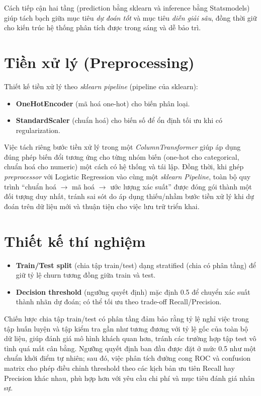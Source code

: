 Cách tiếp cận hai tầng (prediction bằng sklearn và inference bằng Statsmodels) giúp tách bạch giữa mục tiêu \textit{dự đoán tốt} và mục tiêu \textit{diễn giải sâu}, đồng thời giữ cho kiến trúc hệ thống phân tích được trong sáng và dễ bảo trì.

\section{Tiền xử lý (Preprocessing)}
Thiết kế tiền xử lý theo \textit{sklearn pipeline} (pipeline của sklearn):
\begin{itemize}
  \item \textbf{OneHotEncoder} (mã hoá one-hot) cho biến phân loại.
  \item \textbf{StandardScaler} (chuẩn hoá) cho biến số để ổn định tối ưu khi có regularization.
\end{itemize}
\noindent
Việc tách riêng bước tiền xử lý trong một \textit{ColumnTransformer} giúp áp dụng đúng phép biến đổi tương ứng cho từng nhóm biến (one-hot cho categorical, chuẩn hoá cho numeric) một cách có hệ thống và tái lập. Đồng thời, khi ghép \textit{preprocessor} với Logistic Regression vào cùng một \textit{sklearn Pipeline}, toàn bộ quy trình ``chuẩn hoá $\rightarrow$ mã hoá $\rightarrow$ ước lượng xác suất'' được đóng gói thành một đối tượng duy nhất, tránh sai sót do áp dụng thiếu/nhầm bước tiền xử lý khi dự đoán trên dữ liệu mới và thuận tiện cho việc lưu trữ triển khai.

\section{Thiết kế thí nghiệm}
\begin{itemize}
  \item \textbf{Train/Test split} (chia tập train/test) dạng stratified (chia có phân tầng) để giữ tỷ lệ churn tương đồng giữa train và test.
  \item \textbf{Decision threshold} (ngưỡng quyết định) mặc định 0.5 để chuyển xác suất thành nhãn dự đoán; có thể tối ưu theo trade-off Recall/Precision.
\end{itemize}
Chiến lược chia tập train/test có phân tầng đảm bảo rằng tỷ lệ nghỉ việc trong tập huấn luyện và tập kiểm tra gần như tương đương với tỷ lệ gốc của toàn bộ dữ liệu, giúp đánh giá mô hình khách quan hơn, tránh các trường hợp tập test vô tình quá mất cân bằng. Ngưỡng quyết định ban đầu được đặt ở mức 0.5 như một chuẩn khởi điểm tự nhiên; sau đó, việc phân tích đường cong ROC và confusion matrix cho phép điều chỉnh threshold theo các kịch bản ưu tiên Recall hay Precision khác nhau, phù hợp hơn với yêu cầu chi phí và mục tiêu đánh giá nhân sự.

